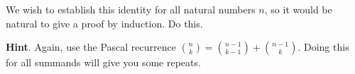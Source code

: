 \documentclass{book}
\begin{document}
\setcounter{cpjt}{77}
\addtocounter{cpjt}{-1}
\begin{activity}\label{activity-70}
\hypertarget{p-576}{}%
We wish to establish this identity for all natural numbers \(n\), so it would be natural to give a proof by induction.  Do this.%
\par\smallskip%
\noindent\textbf{Hint}.\hypertarget{hint-33}{}\quad%
\hypertarget{p-577}{}%
Again, use the Pascal recurrence \(\binom{n}{k} = \binom{n-1}{k-1} + \binom{n-1}{k}\).  Doing this for all summands will give you some repeats.%
\end{activity}

\clearpage
\end{document}
